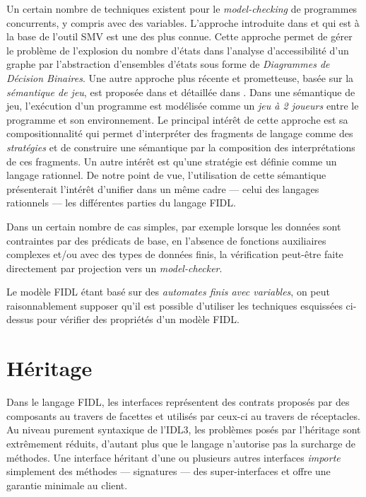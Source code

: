 Un certain nombre de techniques existent pour le \emph{model-checking} de
programmes concurrents, y compris avec des variables. L'approche
introduite dans \cite{smv-thesis} et qui est \`a la base de l'outil
\textsf{SMV} est une des plus connue. Cette approche permet de
g\'erer le probl\`eme de l'explosion du nombre d'\'etats dans
l'analyse d'accessibilit\'e d'un graphe par
l'abstraction d'ensembles d'\'etats sous forme de \emph{Diagrammes de D\'ecision
Binaires}. Une autre approche plus r\'ecente et prometteuse, bas\'ee
sur la \emph{s\'emantique de jeu}, est propos\'ee dans
\cite{abramsky-etal} et d\'etaill\'ee dans \cite{ghica-tg}. Dans une
s\'emantique de jeu\cite{algo-game-sem}, l'ex\'ecution d'un
programme est mod\'elis\'ee comme un \emph{jeu \`a 2 joueurs} entre le
programme et  son environnement. Le principal int\'er\^et de cette
approche est sa compositionnalit\'e qui permet d'interpr\'eter des
fragments de langage comme des \emph{strat\'egies} et de construire une s\'emantique par la
composition des interpr\'etations de ces fragments. Un autre
int\'er\^et est qu'une strat\'egie est d\'efinie comme un langage
rationnel. De notre point de vue, l'utilisation de cette s\'emantique
pr\'esenterait l'int\'er\^et d'unifier dans un m\^eme cadre ---
celui des langages rationnels --- les diff\'erentes parties du
langage \textsf{FIDL}. 

Dans un certain nombre de cas simples, par exemple lorsque les
donn\'ees sont contraintes par des pr\'edicats de base, en l'absence de
fonctions auxiliaires complexes et/ou avec des types de donn\'ees finis, la
v\'erification peut-\^etre faite directement par projection vers un
\emph{model-checker}. 

Le mod\`ele \textsf{FIDL} \'etant bas\'e sur des \emph{automates finis avec
  variables}, on peut  raisonnablement supposer qu'il est
possible d'utiliser les techniques esquiss\'ees ci-dessus pour
  v\'erifier des propri\'et\'es d'un mod\`ele \textsf{FIDL}.

\section{H\'eritage}

\label{sec:heritage-comportemental}
Dans le langage \textsf{FIDL}, les interfaces repr\'esentent des contrats
propos\'es par des composants au travers de facettes et utilis\'es par
ceux-ci au travers de r\'eceptacles. Au niveau purement syntaxique de
l'\textsf{IDL3}, les probl\`emes pos\'es par l'h\'eritage sont extr\^emement r\'eduits,
d'autant plus que le langage n'autorise pas la surcharge de m\'ethodes.
Une interface h\'eritant d'une ou plusieurs autres interfaces \emph{importe}
simplement des m\'ethodes --- signatures --- des super-interfaces et offre une garantie
minimale au client. 

